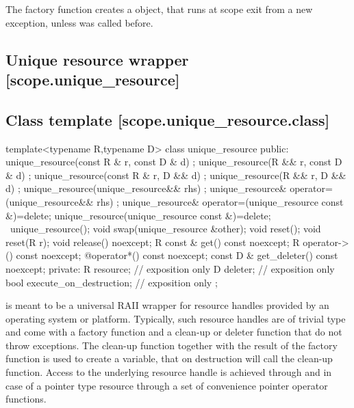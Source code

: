 \documentclass[ebook,11pt,article]{memoir}
\begin{document}
\begin{itemdescr}
\pnum
The factory function creates a  object, that runs  at scope exit from a new exception, unless  was called before.

\end{itemdescr}




\subsection{Unique resource wrapper [scope.unique_resource]}

\subsection {Class template  [scope.unique_resource.class]}

\begin{codeblock}
template<typename R,typename D>
class unique_resource {
public:
  unique_resource(const R & r, const D & d) ;
  unique_resource(R && r, const D & d) ;
  unique_resource(const R & r, D && d) ;
  unique_resource(R && r, D && d) ;
  unique_resource(unique_resource&& rhs) ;
  unique_resource& operator=(unique_resource&& rhs) ;
  unique_resource& operator=(unique_resource const &)=delete;
  unique_resource(unique_resource const &)=delete; 
  ~unique_resource();
  void swap(unique_resource &other);
  void reset();
  void reset(R r);
  void release() noexcept;
  R const & get() const noexcept;
  R operator->() const noexcept;
  @\seebelow@ operator*() const noexcept;
  const D & get_deleter() const noexcept;
private:
  R resource; // exposition only
  D deleter; // exposition only
  bool execute_on_destruction; // exposition only
};
\end{codeblock}

\pnum
\enternote
{} is meant to be a universal RAII wrapper for resource handles provided by an operating system or platform.
Typically, such resource handles are of trivial type and come with a factory function and a clean-up or deleter function that do not throw exceptions.
The clean-up function together with the result of the factory function is used to create a  variable, that on destruction will call the clean-up function. Access to the underlying resource handle is achieved through  and in case of a pointer type resource through a set of convenience pointer operator functions.
\exitnote
\end{document}
